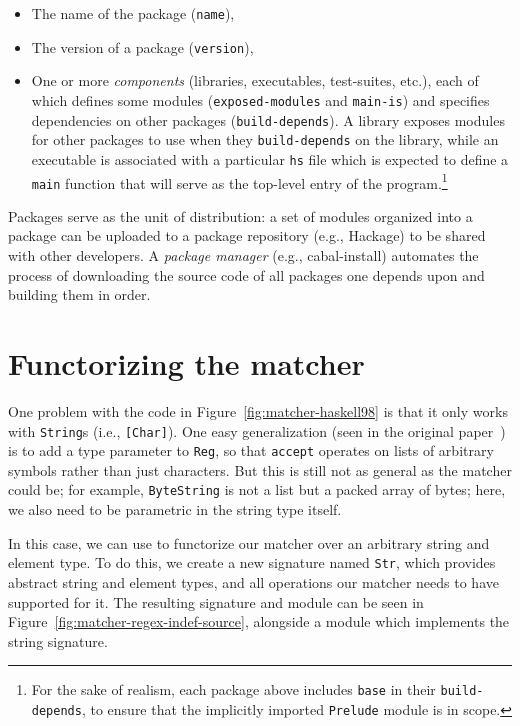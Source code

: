 \begin{itemize}
    \item The name of the package (\verb|name|),
    \item The version of a package (\verb|version|),
    \item One or more \emph{components} (libraries, executables,
    test-suites, etc.), each of which defines some modules
    (\verb|exposed-modules| and \verb|main-is|) and specifies
    dependencies on other packages (\verb|build-depends|).
    A library exposes modules for other packages to use when
    they \verb|build-depends| on the library, while an
    executable is associated with a particular \verb|hs| file
    which is expected to define a \verb|main| function that
    will serve as the top-level entry of the program.\footnote{For the
    sake of realism, each package above includes \texttt{base} in their
    \texttt{build-depends}, to ensure that the implicitly imported
    \texttt{Prelude} module is in scope.}
\end{itemize}
Packages serve as the unit of distribution: a set of modules organized
into a package can be uploaded to a package repository (e.g., Hackage)
to be shared with other developers.  A \emph{package
manager} (e.g., cabal-install) automates the process of downloading the source code of all
packages one depends upon and building them in order.

\section{Functorizing the matcher}

One problem with the code in Figure~\ref{fig:matcher-haskell98} is that
it only works with \verb|String|s (i.e., \verb|[Char]|).  One easy
generalization (seen in the original
paper~\cite{Fischer:2010:PRE:1863543.1863594}) is to add a type
parameter to \verb|Reg|, so that \verb|accept| operates on lists of
arbitrary symbols rather than just characters.  But this is still not as
general as the matcher could be; for example,
\verb|ByteString| is not a list but a packed array of bytes; here,
we also need to be parametric in the string type itself.

In this case, we can use \Backpack{} to functorize our matcher over an
arbitrary string and element type.  To do this, we create a new
signature named \verb|Str|, which provides abstract string and element
types, and all operations our matcher needs to have supported for it.
The resulting signature and module can be seen in
Figure~\ref{fig:matcher-regex-indef-source}, alongside a module which
implements the string signature.

